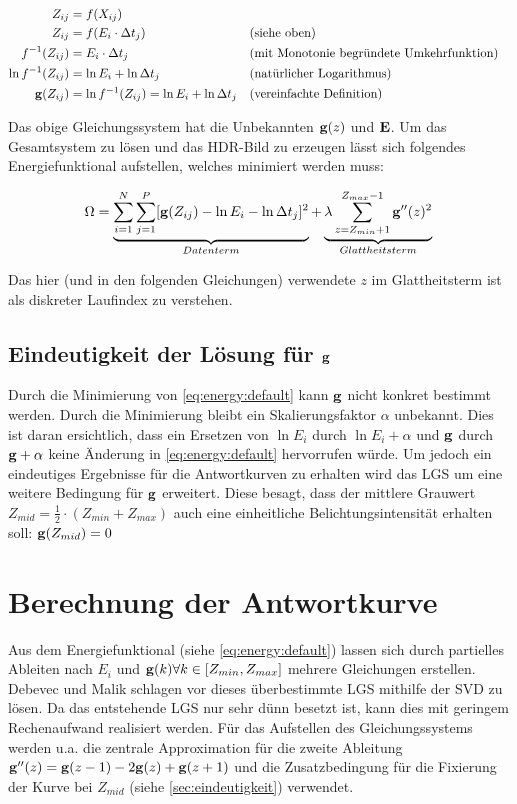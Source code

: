\begin{align*}
Z_{ij} &= f(X_{ij})\\
Z_{ij} &=f(E_i \cdot \Delta t_j)&&\text{(siehe oben)}\\
f^{-1}(Z_{ij}) &= E_i \cdot \Delta t_j & &\text{(mit Monotonie begründete Umkehrfunktion)}\\
\ln f^{-1}(Z_{ij}) &= \ln E_i + \ln \Delta t_j&&\text{(natürlicher Logarithmus)}\\
\mathbf g(Z_{ij}) &= \ln f^{-1}(Z_{ij}) = \ln E_i + \ln \Delta t_j && \text{(vereinfachte Definition)}\\
\end{align*}

Das obige Gleichungssystem hat die Unbekannten $\mathbf g(z)$ und $\mathbf E$. Um das Gesamtsystem zu lösen und das \gls{HDR}-Bild zu erzeugen lässt sich folgendes Energiefunktional aufstellen, welches minimiert werden muss:

\begin{equation}
\label{eq:energy:default}
\Omega = \underbrace{\sum \limits_{i=1}^{N} \sum \limits_{j=1}^{P}[\mathbf g(Z_{ij}) - \ln E_i - \ln \Delta t_j]^2}_{Datenterm} + \underbrace{\lambda  \sum \limits_{z=Z_{min}+1}^{Z_{max}-1} \mathbf{g}''(z)^2}_{Glattheitsterm}\\
\end{equation}

Das hier (und in den folgenden Gleichungen) verwendete $z$ im Glattheitsterm ist als diskreter Laufindex zu verstehen. 

\subsection{Eindeutigkeit der Lösung für $\mathbf g$}
\label{sec:eindeutigkeit}
Durch die Minimierung von \autoref{eq:energy:default} kann $\mathbf g$ nicht konkret bestimmt werden. Durch die Minimierung bleibt ein Skalierungsfaktor $\alpha$ unbekannt. Dies ist daran ersichtlich, dass ein Ersetzen von $\ln E_i$ durch $\ln E_i + \alpha$ und $\mathbf g$ durch $\mathbf g + \alpha$ keine Änderung in \autoref{eq:energy:default} hervorrufen würde. Um jedoch ein eindeutiges Ergebnisse für die Antwortkurven zu erhalten wird das \gls{LGS} um eine weitere Bedingung für $\mathbf g$ erweitert. Diese besagt, dass der mittlere Grauwert $Z_{mid} = \frac{1}{2}\cdot(Z_{min}+Z_{max})$ auch eine einheitliche Belichtungsintensität erhalten soll: $\mathbf g(Z_{mid}) = 0$

\section{Berechnung der Antwortkurve}
Aus dem Energiefunktional (siehe \autoref{eq:energy:default}) lassen sich durch partielles Ableiten nach $E_i$ und $\mathbf g(k) \forall k \in [Z_{min}, Z_{max}]$ mehrere Gleichungen erstellen. Debevec und Malik schlagen vor dieses überbestimmte \gls{LGS} mithilfe der \gls{SVD} zu lösen. Da das entstehende \gls{LGS} nur sehr dünn besetzt ist, kann dies mit geringem Rechenaufwand realisiert werden. Für das Aufstellen des Gleichungssystems werden u.a. die zentrale Approximation für die zweite Ableitung $\mathbf{g}''(z) = \mathbf g(z-1)-2\mathbf g(z)+\mathbf g(z+1)$ und die Zusatzbedingung für die Fixierung der Kurve bei $Z_{mid}$ (siehe \autoref{sec:eindeutigkeit}) verwendet.


